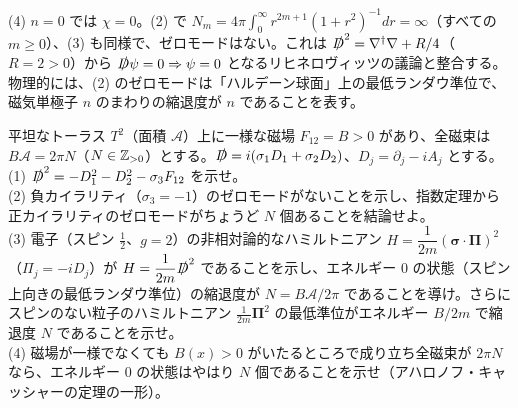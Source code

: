 \begin{solution}
(4) $n=0$ では $\chi=0$。(2) で $N_m=4\pi\int_0^\infty r^{2m+1}(1+r^2)^{-1}dr=\infty$（すべての $m\ge0$）、(3) も同様で、ゼロモードはない。これは $\slashed D^2=\nabla^\dagger\nabla+R/4$（$R=2>0$）から $\slashed D\psi=0\Rightarrow\psi=0$ となるリヒネロヴィッツの議論と整合する。物理的には、(2) のゼロモードは「ハルデーン球面」上の最低ランダウ準位で、磁気単極子 $n$ のまわりの縮退度が $n$ であることを表す。
\end{solution}

\begin{problem}[難易度 B]\label{ch09-prob-landau}
平坦なトーラス $T^2$（面積 $\mathcal A$）上に一様な磁場 $F_{12}=B>0$ があり、全磁束は $B\mathcal A=2\pi N$（$N\in\mathbb{Z}_{>0}$）とする。$\slashed D=i(\sigma_1D_1+\sigma_2D_2)$、$D_j=\partial_j-iA_j$ とする。\\
(1) $\slashed D^2=-D_1^2-D_2^2-\sigma_3F_{12}$ を示せ。\\
(2) 負カイラリティ（$\sigma_3=-1$）のゼロモードがないことを示し、指数定理から正カイラリティのゼロモードがちょうど $N$ 個あることを結論せよ。\\
(3) 電子（スピン $\tfrac12$、$g=2$）の非相対論的なハミルトニアン $H=\dfrac{1}{2m}(\bm\sigma\cdot\bm\Pi)^2$（$\Pi_j=-iD_j$）が $H=\dfrac{1}{2m}\slashed D^2$ であることを示し、エネルギー $0$ の状態（スピン上向きの最低ランダウ準位）の縮退度が $N=B\mathcal A/2\pi$ であることを導け。さらにスピンのない粒子のハミルトニアン $\frac{1}{2m}\bm\Pi^2$ の最低準位がエネルギー $B/2m$ で縮退度 $N$ であることを示せ。\\
(4) 磁場が一様でなくても $B(x)>0$ がいたるところで成り立ち全磁束が $2\pi N$ なら、エネルギー $0$ の状態はやはり $N$ 個であることを示せ（アハロノフ・キャッシャーの定理の一形）。
\end{problem}

